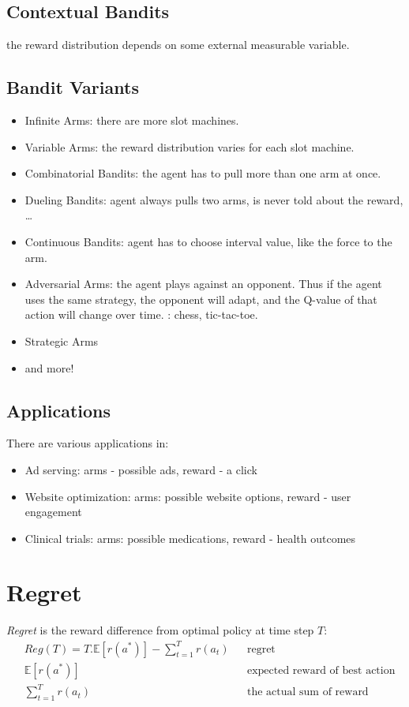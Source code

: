 \subsection{Contextual Bandits}
the reward distribution depends on some external measurable variable.

\subsection{Bandit Variants}
\begin{itemize}
	\item Infinite Arms: there are more slot machines.
	\item Variable Arms: the reward distribution varies for each slot machine.
	\item Combinatorial Bandits: the agent has to pull more than one arm at once.
	\item Dueling Bandits: agent always pulls two arms, is never told about the reward, \dots
	\item Continuous Bandits: agent has to choose interval value, like the force to the arm.
	\item Adversarial Arms: the agent plays against an opponent. Thus if the agent uses the same strategy, the opponent will adapt, and the Q-value of that action will change over time. \Eg: chess, tic-tac-toe.
	\item Strategic Arms
	\item and more!
\end{itemize}

\subsection{Applications}
There are various applications in:
\begin{itemize}
	\item Ad serving: arms - possible ads, reward - a click
	\item Website optimization: arms: possible website options, reward - user engagement
	\item Clinical trials: arms: possible medications, reward - health outcomes
\end{itemize}

\section{Regret}
 \textit{Regret} is the reward difference from optimal policy at time step $T$:
\begin{align*}
	&Reg(T) = T. \mathbb{E}[r(a^*)] - \sum_{t=1}^T r(a_t) && \text{regret}\\
	&\mathbb{E}[r(a^*)] && \text{expected reward of best action}\\
	&\sum_{t=1}^T r(a_t) && \text{the actual sum of reward}
\end{align*}

